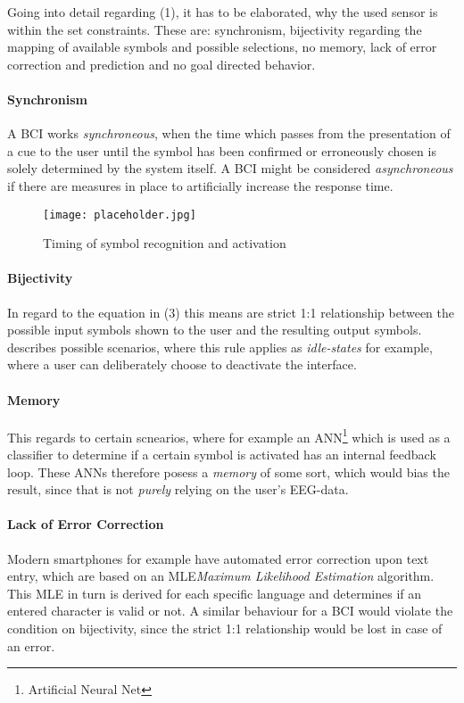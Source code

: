             Going into detail regarding (1), it has to be elaborated, why the used sensor is within the set constraints. These are: synchronism, bijectivity regarding the mapping of available symbols and possible selections, no memory, lack of error correction and prediction and no goal directed behavior.

            \paragraph{Synchronism} A BCI works \textit{synchroneous}, when the time which passes from the presentation of a cue to the user until the symbol has been confirmed or erroneously chosen is solely determined by the system itself. A BCI might be considered \textit{asynchroneous} if there are measures in place to artificially increase the response time. 

            \begin{figure}[h]     %
                \centering
                \texttt{[image: placeholder.jpg]} 
                \caption{Timing of symbol recognition and activation }\label{itr-timing}
            \end{figure}

            \paragraph{Bijectivity} In regard to the equation in (3) this means are strict 1:1 relationship between the possible input symbols shown to the user and the resulting output symbols. \cite{Yuan.2013} describes possible scenarios, where this rule applies as \textit{idle-states} for example, where a user can deliberately choose to deactivate the interface.

            \paragraph{Memory} This regards to certain scnearios, where for example an ANN\footnote{Artificial Neural Net} which is used as a classifier to determine if a certain symbol is activated has an internal feedback loop. These ANNs therefore posess a \textit{memory} of some sort, which would bias the result, since that is not \textit{purely} relying on the user's EEG-data.

            \paragraph{Lack of Error Correction} Modern smartphones for example have automated error correction upon text entry, which are based on an MLE\textit{Maximum Likelihood Estimation} algorithm. This MLE in turn is derived for each specific language and determines if an entered character is valid or not. A similar behaviour for a BCI would violate the condition on bijectivity, since the strict 1:1 relationship would be lost in case of an error.
            
